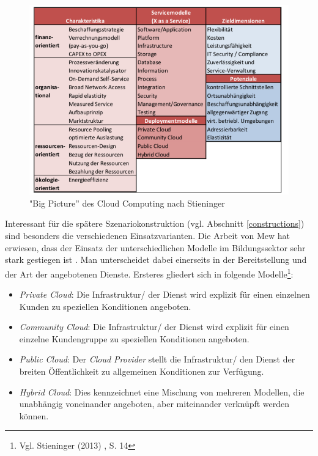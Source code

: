 \begin{figure}
	\centering
	\includegraphics[width=\linewidth]{images/bigpicture}
	\caption[Caption for parameters]{ "Big Picture'' des Cloud Computing nach Stieninger \cite{stieninger}}
	\label{fig:bigpicture}
\end{figure}

Interessant für die spätere Szenariokonstruktion (vgl. Abschnitt \ref{constructions}) sind besonders die verschiedenen Einsatzvarianten. Die Arbeit von Mew hat erwiesen, dass der Einsatz der unterschiedlichen Modelle im Bildungssektor sehr stark gestiegen ist \cite{mew}. Man unterscheidet dabei einerseits in der Bereitstellung und der Art der angebotenen Dienste. Ersteres gliedert sich in folgende Modelle\footnote{Vgl. Stieninger (2013) \cite{stieninger}, S. 14}:
\begin{itemize}
	\item \textit{Private Cloud}: Die Infrastruktur/ der Dienst wird explizit für einen einzelnen Kunden zu speziellen Konditionen angeboten.
	\item \textit{Community Cloud}: Die Infrastruktur/ der Dienst wird explizit für einen einzelne Kundengruppe zu speziellen Konditionen angeboten.
	\item \textit{Public Cloud}: Der \textit{Cloud Provider} stellt die Infrastruktur/ den Dienst der breiten Öffentlichkeit zu allgemeinen Konditionen zur Verfügung.
	\item \textit{Hybrid Cloud}: Dies kennzeichnet eine Mischung von mehreren Modellen, die unabhängig voneinander angeboten, aber miteinander verknüpft werden können.
\end{itemize}

